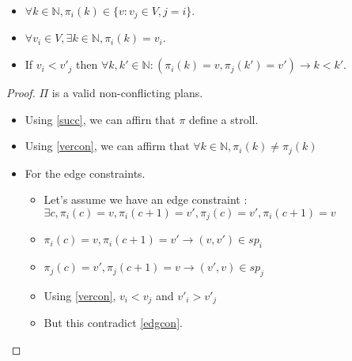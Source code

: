 \begin{itemize}
  \item $\forall k\in \mathbb{N}, \pi_i(k)\in\{v:v_j\in V, j=i\}.$
  \item $\forall v_i\in V, \exists k \in \mathbb{N}, \pi_i(k)=v_i$.
  \item If $v_{i}<v'_{j}$ then $\forall k,k'\in \mathbb{N} : (\pi_{i}(k)=v, \pi_{j}(k')=v') \rightarrow k<k'$.
\end{itemize}
\begin{proof}
$\Pi$ is a valid non-conflicting plans.

\begin{itemize}
  \item Using \ref{succ}, we can affirn that $\pi$ define a stroll. 
  \item Using \ref{vercon}, we can affirm that $\forall k\in \mathbb{N}, \pi_i(k) \not= \pi_j(k)$
  \item For the edge constraints.
  \begin{itemize}
    \item Let's assume we have an edge constraint : $\exists c, \pi_i(c)=v, \pi_i(c+1)=v',\pi_j(c)=v', \pi_i(c+1)=v$
    \item $\pi_i(c)=v, \pi_i(c+1)=v' \rightarrow (v,v') \in sp_i$
    \item $\pi_j(c)=v', \pi_j(c+1)=v \rightarrow (v',v) \in sp_j$
    \item Using \ref{vercon}, $v_i < v_j$ and $v'_i > v'_j$
    \item But this contradict \ref{edgcon}.
  \end{itemize}
\end{itemize}

\end{proof}
